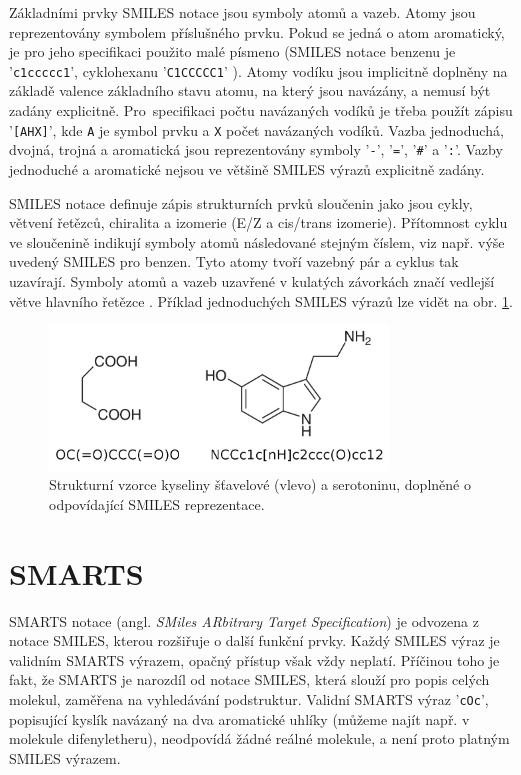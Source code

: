 Základními prvky SMILES notace jsou symboly atomů a vazeb. Atomy jsou reprezentovány symbolem příslušného prvku. Pokud se jedná o atom aromatický, je pro jeho specifikaci použito malé písmeno (SMILES notace benzenu je '\verb|c1ccccc1|', cyklohexanu '\verb|C1CCCCC1|'
). Atomy vodíku jsou implicitně doplněny na základě valence základního stavu atomu, na který jsou navázány, a nemusí být  zadány explicitně. Pro~specifikaci počtu navázaných vodíků je třeba použít zápisu '\verb|[AHX]|', kde \verb|A| je symbol prvku a \verb|X| počet navázaných vodíků. Vazba jednoduchá, dvojná, trojná a aromatická jsou reprezentovány symboly '\verb|-|', '\verb|=|', '\verb|#|' a '\verb|:|'. Vazby jednoduché a aromatické nejsou ve většině SMILES výrazů explicitně zadány.

SMILES notace definuje zápis strukturních prvků sloučenin jako jsou cykly, větvení řetězců, chiralita a izomerie (E/Z a cis/trans izomerie). Přítomnost cyklu ve sloučenině indikují symboly atomů následované stejným číslem, viz např. výše uvedený SMILES pro benzen. Tyto atomy tvoří vazebný pár a cyklus tak uzavírají. Symboly atomů a vazeb uzavřené v kulatých závorkách značí vedlejší větve hlavního řetězce \cite{SMILES_exm}. Příklad jednoduchých SMILES výrazů lze vidět na obr. \ref{SMILES_mols}. 

\begin{figure}[h]
\label{SMILES_mols}
\begin{center}
\includegraphics[width=9cm]{pictures/SMARTS_molecules.png}
\caption{Strukturní vzorce kyseliny šťavelové (vlevo) a serotoninu, doplněné o odpovídající SMILES reprezentace.}
\end{center}
\end{figure}
\section{SMARTS}
\label{SMARTS}
SMARTS notace \cite{SMARTS_intro, SMARTS_exm} (angl. \textit{SMiles ARbitrary Target Specification}) je odvozena z notace SMILES, kterou rozšiřuje o další funkční prvky. Každý SMILES výraz je validním SMARTS výrazem, opačný přístup však vždy neplatí. Příčinou toho je fakt, že SMARTS je narozdíl od  notace SMILES, která slouží pro popis celých molekul, zaměřena na vyhledávání podstruktur. Validní SMARTS výraz '\verb|cOc|', popisující kyslík navázaný na dva aromatické uhlíky (můžeme najít např. v molekule difenyletheru), neodpovídá žádné reálné molekule, a není proto platným SMILES výrazem. 

